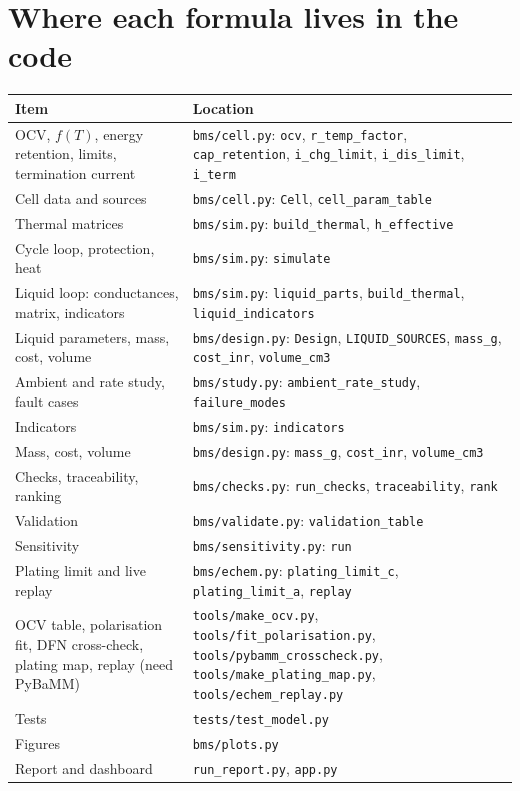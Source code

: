 \documentclass[11pt,a4paper]{article}
\begin{document}
\section{Where each formula lives in the code}
\begin{center}
\begin{tabular}{@{}p{5.6cm}p{9.3cm}@{}}
\toprule
Item & Location \\
\midrule
OCV, $f(T)$, energy retention, limits, termination current & \texttt{bms/cell.py}: \texttt{ocv}, \texttt{r\_temp\_factor}, \texttt{cap\_retention}, \texttt{i\_chg\_limit}, \texttt{i\_dis\_limit}, \texttt{i\_term} \\
Cell data and sources & \texttt{bms/cell.py}: \texttt{Cell}, \texttt{cell\_param\_table} \\
Thermal matrices & \texttt{bms/sim.py}: \texttt{build\_thermal}, \texttt{h\_effective} \\
Cycle loop, protection, heat & \texttt{bms/sim.py}: \texttt{simulate} \\
Liquid loop: conductances, matrix, indicators & \texttt{bms/sim.py}: \texttt{liquid\_parts}, \texttt{build\_thermal}, \texttt{liquid\_indicators} \\
Liquid parameters, mass, cost, volume & \texttt{bms/design.py}: \texttt{Design}, \texttt{LIQUID\_SOURCES}, \texttt{mass\_g}, \texttt{cost\_inr}, \texttt{volume\_cm3} \\
Ambient and rate study, fault cases & \texttt{bms/study.py}: \texttt{ambient\_rate\_study}, \texttt{failure\_modes} \\
Indicators & \texttt{bms/sim.py}: \texttt{indicators} \\
Mass, cost, volume & \texttt{bms/design.py}: \texttt{mass\_g}, \texttt{cost\_inr}, \texttt{volume\_cm3} \\
Checks, traceability, ranking & \texttt{bms/checks.py}: \texttt{run\_checks}, \texttt{traceability}, \texttt{rank} \\
Validation & \texttt{bms/validate.py}: \texttt{validation\_table} \\
Sensitivity & \texttt{bms/sensitivity.py}: \texttt{run} \\
Plating limit and live replay & \texttt{bms/echem.py}: \texttt{plating\_limit\_c}, \texttt{plating\_limit\_a}, \texttt{replay} \\
OCV table, polarisation fit, DFN cross-check, plating map, replay (need PyBaMM) & \texttt{tools/make\_ocv.py}, \texttt{tools/fit\_polarisation.py}, \texttt{tools/pybamm\_crosscheck.py}, \texttt{tools/make\_plating\_map.py}, \texttt{tools/echem\_replay.py} \\
Tests & \texttt{tests/test\_model.py} \\
Figures & \texttt{bms/plots.py} \\
Report and dashboard & \texttt{run\_report.py}, \texttt{app.py} \\
\bottomrule
\end{tabular}
\end{center}
\end{document}
